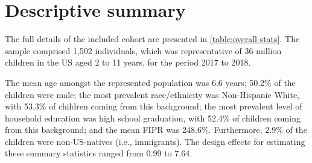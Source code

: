 \section{Descriptive summary}

The full details of the included cohort are presented in \autoref{table:overall-stats}. The sample comprised 1,502 individuals, which was representative of 36 million children in the US aged 2 to 11 years, for the period 2017 to 2018. 

The mean age amongst the represented population was 6.6 years; 50.2\% of the children were male; the most prevalent race/ethnicity was Non-Hispanic White, with 53.3\% of children coming from this background; the most prevalent level of household education was high school graduation, with 52.4\% of children coming from this background; and the mean FIPR was 248.6\%. Furthermore, 2.9\% of the children were non-US-natives (i.e., immigrants). The design effects for estimating these summary statistics ranged from 0.99 to 7.64.

